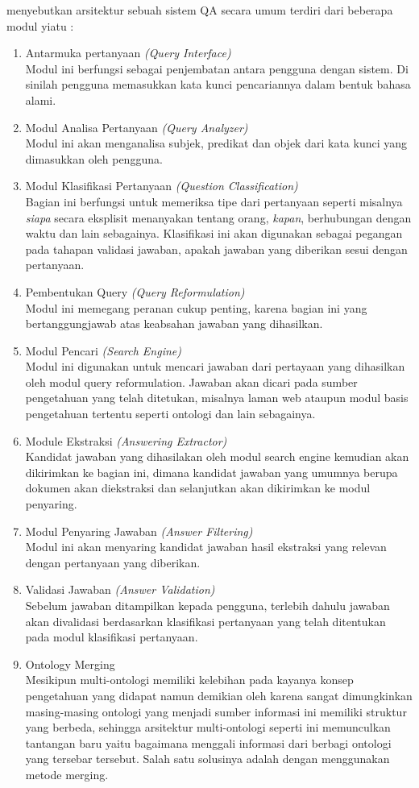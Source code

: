 \citet*{ramprasath_hariharan} menyebutkan arsitektur sebuah sistem QA secara umum terdiri dari beberapa modul yiatu :
\begin{enumerate}
	\item Antarmuka pertanyaan \emph{(Query Interface)} \\
		Modul ini berfungsi sebagai penjembatan antara pengguna dengan sistem. Di sinilah pengguna memasukkan kata kunci pencariannya dalam bentuk bahasa alami.
	\item Modul Analisa Pertanyaan \emph{(Query Analyzer)} \\
		Modul ini akan menganalisa subjek, predikat dan objek dari kata kunci yang dimasukkan oleh pengguna.
	\item Modul Klasifikasi Pertanyaan \emph{(Question Classification)} \\
		Bagian ini berfungsi untuk memeriksa tipe dari pertanyaan seperti misalnya \emph{siapa} secara eksplisit menanyakan tentang orang, \emph{kapan}, berhubungan dengan waktu dan lain sebagainya. Klasifikasi ini akan digunakan sebagai pegangan pada tahapan validasi jawaban, apakah jawaban yang diberikan sesui dengan pertanyaan.
	\item Pembentukan Query \emph{(Query Reformulation)} \\
		Modul ini memegang peranan cukup penting, karena bagian ini yang bertanggungjawab atas keabsahan jawaban yang dihasilkan.
	\item Modul Pencari \emph{(Search Engine)} \\ 
		Modul ini digunakan untuk mencari jawaban dari pertayaan yang dihasilkan oleh modul query reformulation. Jawaban akan dicari pada sumber pengetahuan yang telah ditetukan, misalnya laman web ataupun modul basis pengetahuan tertentu seperti ontologi dan lain sebagainya.
	\item Module Ekstraksi \emph{(Answering Extractor)} \\ 
		Kandidat jawaban yang dihasilakan oleh modul search engine kemudian akan dikirimkan ke bagian ini, dimana kandidat jawaban yang umumnya berupa dokumen akan diekstraksi dan selanjutkan akan dikirimkan ke modul penyaring.
	\item Modul Penyaring Jawaban \emph{(Answer Filtering)} \\
		Modul ini akan menyaring kandidat jawaban hasil ekstraksi yang relevan dengan pertanyaan yang diberikan.
	\item Validasi Jawaban \emph{(Answer Validation)} \\ 
		Sebelum jawaban ditampilkan kepada pengguna, terlebih dahulu jawaban akan divalidasi berdasarkan klasifikasi pertanyaan yang telah ditentukan pada modul klasifikasi pertanyaan.
	\item Ontology Merging \\
		Mesikipun multi-ontologi memiliki kelebihan pada kayanya konsep pengetahuan yang didapat namun demikian oleh karena sangat dimungkinkan masing-masing ontologi yang menjadi sumber informasi ini memiliki struktur yang berbeda, sehingga arsitektur multi-ontologi seperti ini memunculkan tantangan baru yaitu bagaimana menggali informasi dari berbagi ontologi yang tersebar tersebut. Salah satu solusinya adalah dengan menggunakan metode merging.
\end{enumerate}
